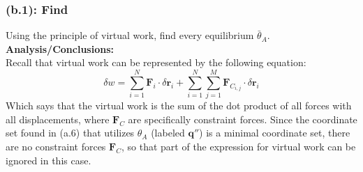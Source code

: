 \documentclass[titlepage]{article}
\begin{document}
\subsubsection*{(b.1): Find}
Using the principle of virtual work, find every equilibrium $\bar{\theta}_A$.\\

\textbf{Analysis/Conclusions:}\\
Recall that virtual work can be represented by the following equation:
\begin{equation}
	\delta w = \sum_{i=1}^{N}\boldsymbol{F}_i\cdot\delta\boldsymbol{r}_i+\sum_{i=1}^{N}\sum_{j=1}^{M}\boldsymbol{F}_{C_{i,j}}\cdot\delta\boldsymbol{r}_i
\end{equation}
Which says that the virtual work is the sum of the dot product of all forces with all displacements, where $\boldsymbol{F}_C$ are specifically constraint forces. Since the coordinate set found in (a.6) that utilizes $\theta_A$ (labeled $\boldsymbol{q}''$) is a minimal coordinate set, there are no constraint forces $\boldsymbol{F}_C$, so that part of the expression for virtual work can be ignored in this case.\\
\end{document}
